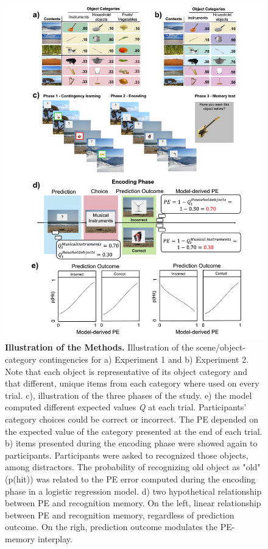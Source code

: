 \documentclass[a4paper,12pt]{article}
\begin{document}
\begin{figure}[ht!]
\centerline
{\includegraphics[width=1\textwidth]{figures/methods.All.png}}
\caption{\textbf{Illustration of the Methods.} Illustration of the scene/object-category contingencies  for a) Experiment 1 and b) Experiment 2. Note that each object is representative of its object category and that different, unique items from each category where used on every trial. c), illustration of the three phases of the study. e) the model computed different expected values \textit{Q} at each trial. Participants' category choices could be correct or incorrect. The PE depended on the expected value of the category presented at the end of each trial. b) items presented during the encoding phase were showed again to participants. Participants were asked to recognized those objects, among distractors. The probability of recognizing old object as "old" (p(hit)) was related to the PE error computed during the encoding phase in a logistic regression model. d) two hypothetical relationship between PE and recognition memory. On the left, linear relationship between PE and recognition memory, regardless of prediction outcome. On the righ, prediction outcome modulates the PE-memory interplay.   }
\label{fig:Methods}
\end{figure}
\end{document}
